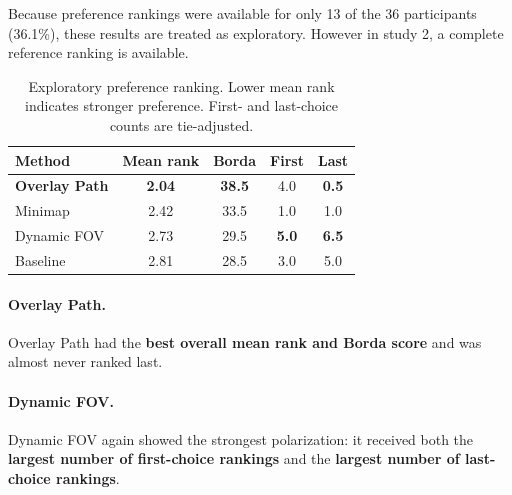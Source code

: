 Because preference rankings were available for only 13 of the 36 participants (36.1\%), these results are treated as exploratory. However in study 2, a complete reference ranking is available. 

\begin{table}[t]
    \centering
    \caption{Exploratory preference ranking. Lower mean rank indicates stronger preference. First- and last-choice counts are tie-adjusted.}
    \label{tab:study1-preference}
    \small
    \begin{tabular}{lcccc}
        \toprule
        \textbf{Method}
        & \textbf{Mean rank}
        & \textbf{Borda}
        & \textbf{First}
        & \textbf{Last} \\
        \midrule

        \textbf{Overlay Path} & \textbf{2.04} & \textbf{38.5} & 4.0 & \textbf{0.5} \\
        Minimap & 2.42 & 33.5 & 1.0 & 1.0 \\
        Dynamic FOV & 2.73 & 29.5 & \textbf{5.0} & \textbf{6.5} \\
        Baseline & 2.81 & 28.5 & 3.0 & 5.0 \\

        \bottomrule
    \end{tabular}
\end{table}

\paragraph{Overlay Path.}
Overlay Path had the \textbf{best overall mean rank and Borda score} and was almost never ranked last.

\paragraph{Dynamic FOV.}
Dynamic FOV again showed the strongest polarization: it received both the \textbf{largest number of first-choice rankings} and the \textbf{largest number of last-choice rankings}.

%


